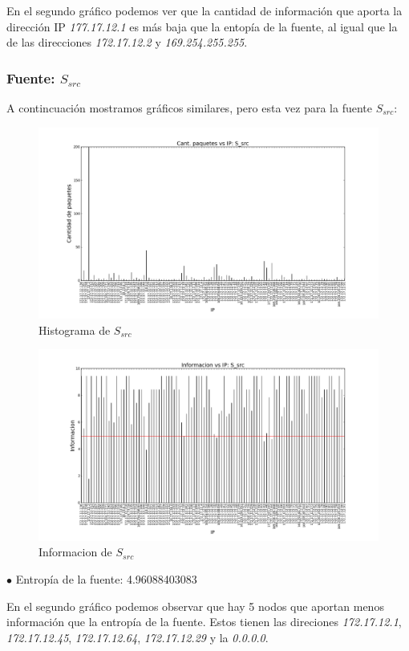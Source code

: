 En el segundo gráfico podemos ver que la cantidad de información que aporta la dirección IP \emph{177.17.12.1} es más baja que la entopía de la fuente, al igual que la de las direcciones \emph{172.17.12.2} y \emph{169.254.255.255}.

\subsubsection{Fuente: $S_{src}$}

A contincuación mostramos gráficos similares, pero esta vez para la fuente $S_{src}$:

\begin{figure}[H]\centering
    \includegraphics[width=0.8\linewidth]{../imgs/red-alto-palermo_S_src_hist.png}
    \caption{Histograma de $S_{src}$}\label{fig:Alto-src-hist}
\end{figure}

\begin{figure}[H]\centering
    \includegraphics[width=0.8\linewidth]{../imgs/red-alto-palermo_S_src_info.png}
    \caption{Informacion de $S_{src}$}\label{fig:Alto-src-info}
\end{figure}

$\bullet$ Entropía de la fuente: 4.96088403083

En el segundo gráfico podemos observar que hay 5 nodos que aportan menos información que la entropía de la fuente. Estos tienen las direciones \emph{172.17.12.1}, \emph{172.17.12.45}, \emph{172.17.12.64}, \emph{172.17.12.29} y la \emph{0.0.0.0}. 

